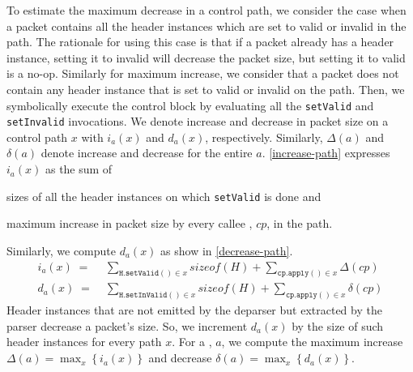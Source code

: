 \documentclass[letterpaper,twocolumn,10pt]{article}
\begin{document}



To estimate the maximum decrease in a control path, we consider the
case when a packet contains all the header instances which are set to
valid or invalid in the path. The rationale for using this case is
that if a packet already has a header instance, setting it to invalid
will decrease the packet size, but setting it to valid is a no-op.
Similarly for maximum increase, we consider that a packet does not
contain any header instance that is set to valid or invalid on the
path. Then, we symbolically execute the control block by evaluating
all the \texttt{setValid} and \texttt{setInvalid} invocations.  We
denote increase and decrease in packet size on a control path $x$ with
$i_{a}(x)$ and $d_{a}(x)$, respectively. Similarly, $\Delta(a)$ and
$\delta(a)$ denote increase and decrease for the entire \uprogram $a$.
\cref{increase-path} expresses $i_{a}(x)$ as the sum of
\begin{enumerate*}[label=(\roman*)]
  \item sizes of all the header instances on which \texttt{setValid}
    is done and
  \item maximum increase in packet size by every callee \uprogram,
    $cp$, in the path.
\end{enumerate*}
Similarly, we compute $d_{a}(x)$ as show in \cref{decrease-path}.
\begin{align}
  i_{a}(x)\; =& \; \sum_{\mathtt{H.setValid()} \in x} sizeof(H) +
  \sum_{\mathtt{cp.apply()} \in x} \Delta(cp) \label{increase-path} \\
  d_{a}(x)\; =& \; \sum_{\mathtt{H.setInValid()} \in x} sizeof(H) +
  \sum_{\mathtt{cp.apply()} \in x} \delta(cp) \label{decrease-path}
\end{align}
Header instances that are not emitted by the deparser but extracted by
the parser decrease a packet's size. So, we increment $d_{a}(x)$ by
the size of such header instances for every path $x$.
For a \uprogram, $a$, we compute the maximum increase $\Delta(a) = 
\max_{x} \left\{ i_{a}(x) \right\} $ and decrease $\delta(a) = 
\max_{x} \left\{ d_{a}(x) \right\}$.
\end{document}
